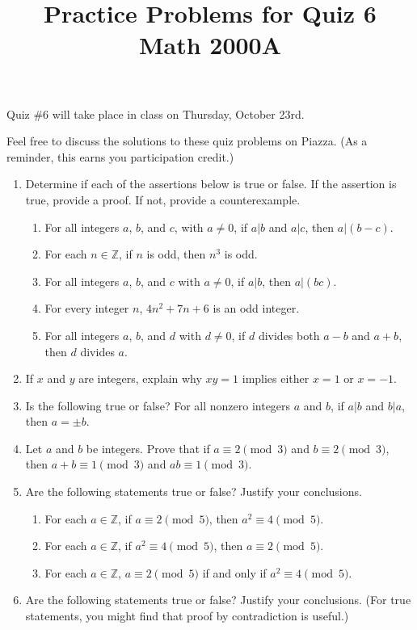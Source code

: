 \documentclass[letterpaper,12pt]{article}
\title{Practice Problems for Quiz 6\\Math 2000A}
\date{}
\newcommand{\Z}{\mathbb{Z}}
\newcommand{\modd}[3]{#1\equiv #2 \pmod{#3}}
\begin{document}
 \maketitle
\vspace{-0.5in}

Quiz \#6 will take place in class on Thursday, October 23rd. 

Feel free to discuss the solutions to these quiz problems on Piazza. (As a reminder, this earns you participation credit.)
\begin{enumerate}
 \item Determine if each of the assertions below is true or false. If the assertion is true, provide a proof. If not, provide a counterexample.
\begin{enumerate}
 \item For all integers $a$, $b$, and $c$, with $a\neq 0$, if $a|b$ and $a|c$, then $a|(b-c)$.
 \item For each $n\in \Z$, if $n$ is odd, then $n^3$ is odd.
 \item For all integers $a$, $b$, and $c$ with $a\neq 0$, if $a|b$, then $a|(bc)$.
 \item For every integer $n$, $4n^2+7n+6$ is an odd integer.
 \item For all integers $a$, $b$, and $d$ with $d\neq 0$, if $d$ divides both $a-b$ and $a+b$, then $d$ divides $a$.
\end{enumerate}
 \item If $x$ and $y$ are integers, explain why $xy=1$ implies either $x=1$ or $x=-1$.
 \item Is the following true or false? For all nonzero integers $a$ and $b$, if $a|b$ and $b|a$, then $a=\pm b$.
 \item Let $a$ and $b$ be integers. Prove that if $\modd{a}{2}{3}$ and $\modd{b}{2}{3}$, then $\modd{a+b}{1}{3}$ and $\modd{ab}{1}{3}$.
 \item Are the following statements true or false? Justify your conclusions.
\begin{enumerate}
 \item For each $a\in\Z$, if $\modd{a}{2}{5}$, then $\modd{a^2}{4}{5}$.
 \item For each $a\in\Z$, if $\modd{a^2}{4}{5}$, then $\modd{a}{2}{5}$.
 \item For each $a\in\Z$, $\modd{a}{2}{5}$ if and only if $\modd{a^2}{4}{5}$.
\end{enumerate}
\item Are the following statements true or false? Justify your conclusions. (For true statements, you might find that proof by contradiction is useful.)

\end{enumerate}
\end{document}
